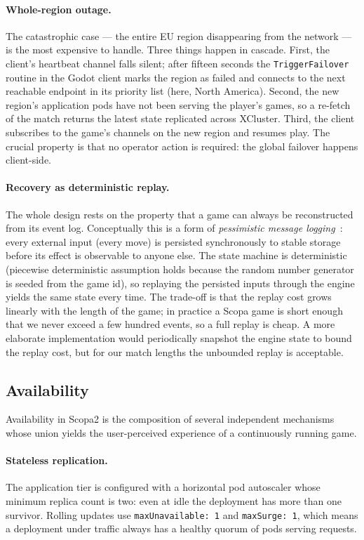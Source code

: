 \documentclass{scrartcl}
\begin{document}
\paragraph{Whole-region outage.} The catastrophic case --- the entire
EU region disappearing from the network --- is the most expensive to
handle. Three things happen in cascade. First, the client's heartbeat
channel falls silent; after fifteen seconds the
\texttt{TriggerFailover} routine in the Godot client marks the region
as failed and connects to the next reachable endpoint in its priority
list (here, North America). Second, the new region's application
pods have not been serving the player's games, so a re-fetch of the
match returns the latest state replicated across XCluster. Third, the
client subscribes to the game's channels on the new region and
resumes play. The crucial property is that no operator action is
required: the global failover happens client-side.

\paragraph{Recovery as deterministic replay.} The whole design rests on
the property that a game can always be reconstructed from its event
log. Conceptually this is a form of \emph{pessimistic message
logging}~\citep{elnozahy2002survey}: every external input (every move)
is persisted synchronously to stable storage before its effect is
observable to anyone else. The state machine is deterministic
(piecewise deterministic assumption holds because the random number
generator is seeded from the game id), so replaying the persisted
inputs through the engine yields the same state every time. The
trade-off is that the replay cost grows linearly with the length of
the game; in practice a Scopa game is short enough that we never
exceed a few hundred events, so a full replay is cheap. A more
elaborate implementation would periodically snapshot the engine state
to bound the replay cost, but for our match lengths the unbounded
replay is acceptable.

\subsection{Availability}\label{availability}

Availability in Scopa2 is the composition of several independent
mechanisms whose union yields the user-perceived experience of a
continuously running game.

\paragraph{Stateless replication.} The application tier is configured
with a horizontal pod autoscaler whose minimum replica count is two:
even at idle the deployment has more than one survivor. Rolling
updates use \texttt{maxUnavailable: 1} and \texttt{maxSurge: 1}, which
means a deployment under traffic always has a healthy quorum of pods
serving requests.
\end{document}
